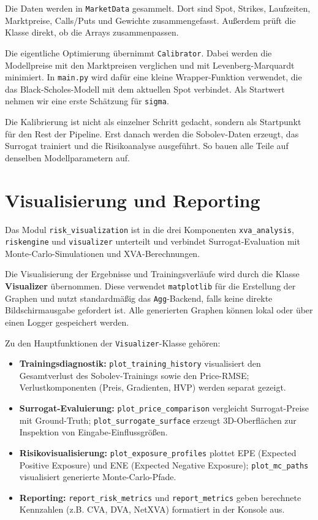 \documentclass{book}
\begin{document}
Die Daten werden in \texttt{MarketData} gesammelt. Dort sind Spot, Strikes, Laufzeiten, Marktpreise, Calls/Puts und Gewichte zusammengefasst. Außerdem prüft die Klasse direkt, ob die Arrays zusammenpassen.

Die eigentliche Optimierung übernimmt \texttt{Calibrator}. Dabei werden die Modellpreise mit den Marktpreisen verglichen und mit Levenberg-Marquardt minimiert. In \texttt{main.py} wird dafür eine kleine Wrapper-Funktion verwendet, die das Black-Scholes-Modell mit dem aktuellen Spot verbindet. Als Startwert nehmen wir eine erste Schätzung für \texttt{sigma}.

Die Kalibrierung ist nicht als einzelner Schritt gedacht, sondern als Startpunkt für den Rest der Pipeline. Erst danach werden die Sobolev-Daten erzeugt, das Surrogat trainiert und die Risikoanalyse ausgeführt. So bauen alle Teile auf denselben Modellparametern auf.

\section{Visualisierung und Reporting}
Das Modul \texttt{risk\_visualization} ist in die drei Komponenten \texttt{xva\_analysis}, \texttt{riskengine} und \texttt{visualizer} unterteilt 
und verbindet Surrogat-Evaluation mit Monte-Carlo-Simulationen und XVA-Berechnungen.

Die Visualisierung der Ergebnisse und Trainingsverläufe wird durch die Klasse \textbf{Visualizer} übernommen. 
Diese verwendet \texttt{matplotlib} für die Erstellung der Graphen und nutzt standardmäßig das \texttt{Agg}-Backend, 
falls keine direkte Bildschirmausgabe gefordert ist. Alle generierten Graphen können lokal oder über einen Logger gespeichert werden.

Zu den Hauptfunktionen der \texttt{Visualizer}-Klasse gehören:
\begin{itemize}
\item \textbf{Trainingsdiagnostik:} \texttt{plot\_training\_history} visualisiert den Gesamtverlust des Sobolev-Trainings sowie den Price-RMSE; 
Verlustkomponenten (Preis, Gradienten, HVP) werden separat gezeigt.
\item \textbf{Surrogat-Evaluierung:} \texttt{plot\_price\_comparison} vergleicht Surrogat-Preise mit Ground-Truth; 
\texttt{plot\_surrogate\_surface} erzeugt 3D-Oberflächen zur Inspektion von Eingabe-Einflussgrößen.
\item \textbf{Risikovisualisierung:} \texttt{plot\_exposure\_profiles} plottet EPE (Expected Positive Exposure) und ENE (Expected Negative Exposure); 
\texttt{plot\_mc\_paths} visualisiert generierte Monte-Carlo-Pfade.
\item \textbf{Reporting:} \texttt{report\_risk\_metrics} und \texttt{report\_metrics} geben berechnete Kennzahlen (z.B. CVA, DVA, NetXVA) formatiert in der Konsole aus.
\end{itemize}
\end{document}
